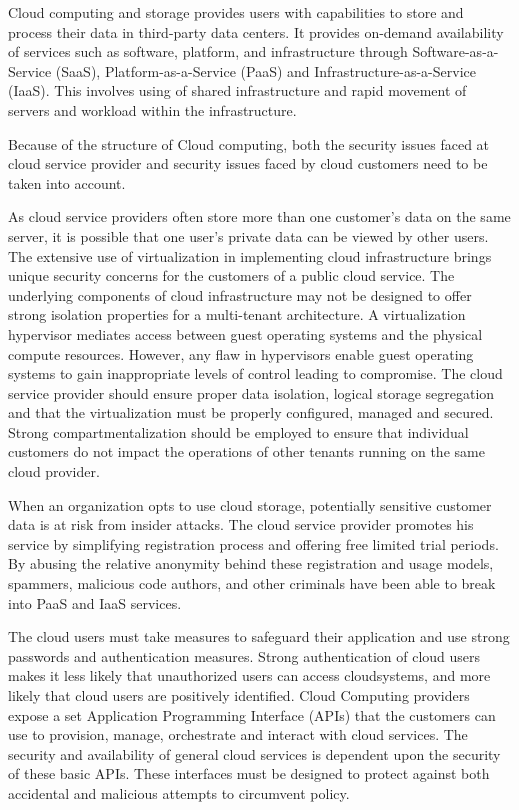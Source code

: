 \begin{multicols}{2}
Cloud computing and storage provides users with capabilities to store and process their data in third-party data centers. It provides on-demand availability of services such as software, platform, and infrastructure through Software-as-a-Service (SaaS), Platform-as-a-Service (PaaS) and Infrastructure-as-a-Service (IaaS). This involves using of shared infrastructure and rapid movement of servers and workload within the infrastructure. 

Because of the structure of Cloud computing, both the security issues faced at cloud service provider and security issues faced by cloud customers need to be taken into account.

As cloud service providers often store more than one customer's data on the same server, it is possible that one user's private data can be viewed by other users. The extensive use of virtualization in implementing cloud infrastructure brings unique security concerns for the customers of a public cloud service. The underlying components of cloud infrastructure may not be designed to offer strong isolation properties for a multi-tenant architecture. A virtualization hypervisor mediates access between guest operating systems and the physical compute resources. However, any flaw in hypervisors enable guest operating systems to gain inappropriate levels of control leading to compromise. The cloud service provider should ensure proper data isolation, logical storage segregation and that the virtualization must be properly configured, managed and secured. Strong compartmentalization should be employed to ensure that individual customers do not impact the operations of other tenants running on the same cloud provider.

When an organization opts to use cloud storage, potentially sensitive customer data is at risk from insider attacks. The cloud service provider promotes his service by simplifying registration process and offering free limited trial periods. By abusing the relative anonymity behind these registration and usage models, spammers, malicious code authors, and other criminals have been able to break into PaaS and IaaS services. 

The cloud users must take measures to safeguard their application and use strong passwords and authentication measures. Strong authentication of cloud users makes it less likely that unauthorized users can access cloud\break systems, and more likely that cloud users are positively identified. Cloud Computing providers expose a set Application Programming Interface (APIs) that the customers can use to provision, manage, orchestrate and interact with cloud services. The security and availability of general cloud services is dependent upon the security of these basic APIs. These interfaces must be designed to protect against both accidental and malicious attempts to circumvent policy.


\end{multicols}
